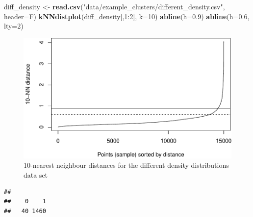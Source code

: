 \documentclass[]{book}
\newenvironment{Shaded}{\begin{snugshade}}{\end{snugshade}}
\newcommand{\KeywordTok}[1]{\textcolor[rgb]{0.13,0.29,0.53}{\textbf{{#1}}}}
\newcommand{\DataTypeTok}[1]{\textcolor[rgb]{0.13,0.29,0.53}{{#1}}}
\newcommand{\DecValTok}[1]{\textcolor[rgb]{0.00,0.00,0.81}{{#1}}}
\newcommand{\FloatTok}[1]{\textcolor[rgb]{0.00,0.00,0.81}{{#1}}}
\newcommand{\StringTok}[1]{\textcolor[rgb]{0.31,0.60,0.02}{{#1}}}
\newcommand{\NormalTok}[1]{{#1}}
\theoremstyle{definition}
\theoremstyle{definition}
\theoremstyle{definition}
\theoremstyle{remark}
\begin{document}
\begin{Shaded}
\begin{Highlighting}[]
\NormalTok{diff_density <-}\StringTok{ }\KeywordTok{read.csv}\NormalTok{(}\StringTok{"data/example_clusters/different_density.csv"}\NormalTok{, }\DataTypeTok{header=}\NormalTok{F)}
\KeywordTok{kNNdistplot}\NormalTok{(diff_density[,}\DecValTok{1}\NormalTok{:}\DecValTok{2}\NormalTok{], }\DataTypeTok{k=}\DecValTok{10}\NormalTok{)}
\KeywordTok{abline}\NormalTok{(}\DataTypeTok{h=}\FloatTok{0.9}\NormalTok{)}
\KeywordTok{abline}\NormalTok{(}\DataTypeTok{h=}\FloatTok{0.6}\NormalTok{, }\DataTypeTok{lty=}\DecValTok{2}\NormalTok{)}
\end{Highlighting}
\end{Shaded}

\begin{figure}

{\centering \includegraphics[width=0.75\linewidth]{09-clustering_files/figure-latex/diffDensityKNNdist-1} 

}

\caption{10-nearest neighbour distances for the different density distributions data set}\label{fig:diffDensityKNNdist}
\end{figure}

\begin{Shaded}
\end{Shaded}

\begin{verbatim}
## 
##    0    1 
##   40 1460
\end{verbatim}
\end{document}
